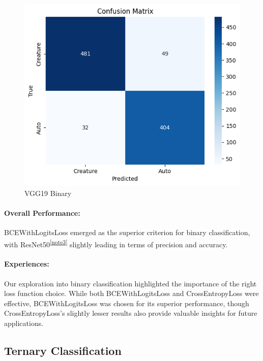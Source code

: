 \documentclass{article} %
\begin{document}
\begin{figure}[htbp]
\begin{minipage}{.3\textwidth}
    \label{fig:resnet_cm_bin}
  \end{minipage}%
  \hfill
  \begin{minipage}{.3\textwidth}
    \centering
    \includegraphics[width=\linewidth]{./figure+object/vgg_binary_bce.png}
    \caption{VGG19 Binary}
    \label{fig:vgg_cm_bin}
  \end{minipage}
\end{figure}


\paragraph{Overall Performance:}
BCEWithLogitsLoss emerged as the superior criterion for binary classification, with ResNet50\textsuperscript{\ref{note3}} slightly leading in terms of precision and accuracy.


\paragraph{Experiences:}
Our exploration into binary classification highlighted the importance of the right loss function choice. While both BCEWithLogitsLoss and CrossEntropyLoss were effective, BCEWithLogitsLoss was chosen for its superior performance, though CrossEntropyLoss's slightly lesser results also provide valuable insights for future applications.


\subsection{Ternary Classification}
\end{document}

